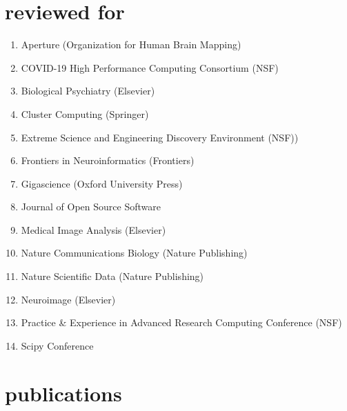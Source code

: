 \documentclass[]{friggeri-cv} %
\begin{document}
\section{reviewed for}
\begin{enumerate}
\item Aperture (Organization for Human Brain Mapping)
\item COVID-19 High Performance Computing Consortium (NSF)
\item Biological Psychiatry (Elsevier)
\item Cluster Computing (Springer)
\item Extreme Science and Engineering Discovery Environment (NSF))
\item Frontiers in Neuroinformatics (Frontiers)
\item Gigascience (Oxford University Press)
\item Journal of Open Source Software
\item Medical Image Analysis (Elsevier)
\item Nature Communications Biology (Nature Publishing)
\item Nature Scientific Data (Nature Publishing)
\item Neuroimage (Elsevier)
\item Practice \& Experience in Advanced Research Computing Conference (NSF)
\item Scipy Conference
\end{enumerate}

\section{publications}




\end{document}
